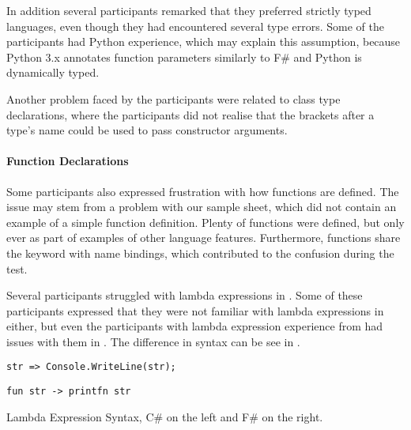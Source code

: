 In addition several participants remarked that they preferred strictly typed languages, even though they had encountered several type errors. Some of the participants had Python experience, which may explain this assumption, because Python 3.x annotates function parameters similarly to F\# and Python is dynamically typed.

Another problem faced by the participants were related to class type declarations, where the participants did not realise that the brackets after a type's name could be used to pass constructor arguments.

\paragraph{Function Declarations}
Some participants also expressed frustration with how functions are defined. The issue may stem from a problem with our sample sheet, which did not contain an example of a simple function definition. Plenty of functions were defined, but only ever as part of examples of other language features. Furthermore, functions share the  keyword with name bindings, which contributed to the confusion during the test.

Several participants struggled with lambda expressions in \fs. Some of these participants expressed that they were not familiar with lambda expressions in \cs either, but even the participants with lambda expression experience from \cs had issues with them in \fs. The difference in syntax can be see in .

\begin{listing}[H]
\begin{minipage}{.5\textwidth}
\begin{verbatim}
str => Console.WriteLine(str);
\end{verbatim}
\end{minipage}
\hfill
\begin{minipage}{.4\textwidth}
\begin{verbatim}
fun str -> printfn str
\end{verbatim}
\end{minipage}
\caption{Lambda Expression Syntax, C\# on the left and F\# on the right.}
\label{lst:lam-exp-syn}
\end{listing}